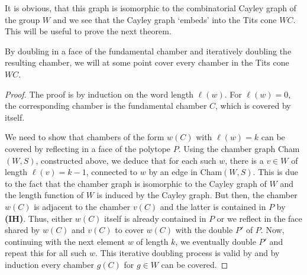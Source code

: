 It is obvious, that this graph is isomorphic to the combinatorial Cayley graph of the group \(W\) and we see that the Cayley graph `embeds' into the Tits cone \(WC\).
This will be useful to prove the next theorem.

\begin{theorem}
    By doubling in a face of the fundamental chamber and iteratively doubling the resulting chamber, we will at some point cover every chamber in the Tits cone \(WC\).
\end{theorem}
\begin{proof}
    The proof is by induction on the word length \(\ell(w)\).
    For \(\ell(w) = 0\), the corresponding chamber is the fundamental chamber \(C\), which is covered by itself.
    \par\noindent
    We need to show that chambers of the form \(w(C)\) with \(\ell(w) = k\) can be covered by reflecting in a face of the polytope \(P\).
    Using the chamber graph Cham\((W, S)\), constructed above, we deduce that for each such \(w\), there is a \(v \in W\) of length \(\ell(v) = k - 1\), connected to \(w\) by an edge in Cham\((W, S)\). %
    This is due to the fact that the chamber graph is isomorphic to the Cayley graph of  \(W\) and the length function of \(W\) is induced by the Cayley graph.
    But then, the chamber \(w(C)\) is adjacent to the chamber \(v(C)\) and the latter is contained in \(P\) by \textbf{(IH)}.
    Thus, either \(w(C)\) itself is already contained in \(P\) or we reflect in the face shared by \(w(C)\) and \(v(C)\) to cover \(w(C)\) with the double \(P'\) of \(P\).
    Now, continuing with the next element \(w\) of length \(k\), we eventually double \(P'\) and repeat this for all such \(w\).
    This iterative doubling process is valid by  and by induction every chamber \(g(C)\) for \(g \in W\) can be covered.
\end{proof}

